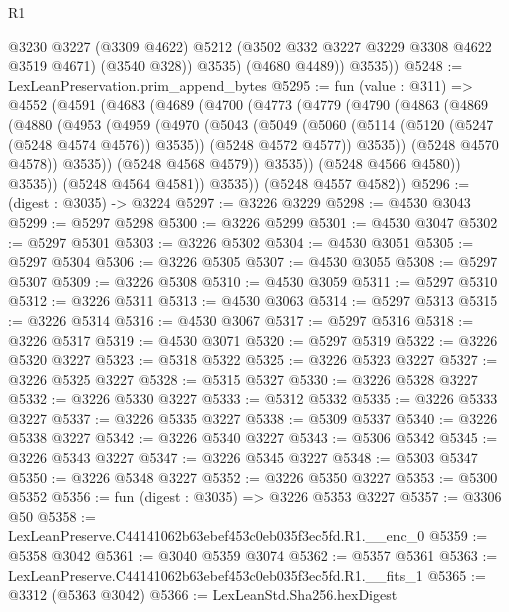 \begin{lexlean}{R1}
\begin{coremodule}
              @3230
              @3227
              (@3309 @4622)
              @5212
              (@3502 @332 @3227 @3229 @3308 @4622 @3519 @4671)
              (@3540 @328))
            @3535)
          (@4680 @4489))
        @3535))
@5248 := LexLeanPreservation.prim_append_bytes
@5295 := fun (value : @311) =>
  @4552
    (@4591
      (@4683
        (@4689
          (@4700
            (@4773
              (@4779
                (@4790
                  (@4863
                    (@4869
                      (@4880
                        (@4953
                          (@4959
                            (@4970
                              (@5043
                                (@5049
                                  (@5060
                                    (@5114 (@5120 (@5247 (@5248 @4574 @4576)) @3535))
                                    (@5248 @4572 @4577))
                                  @3535))
                              (@5248 @4570 @4578))
                            @3535))
                        (@5248 @4568 @4579))
                      @3535))
                  (@5248 @4566 @4580))
                @3535))
            (@5248 @4564 @4581))
          @3535))
      (@5248 @4557 @4582))
@5296 := (digest : @3035) -> @3224
@5297 := @3226 @3229
@5298 := @4530 @3043
@5299 := @5297 @5298
@5300 := @3226 @5299
@5301 := @4530 @3047
@5302 := @5297 @5301
@5303 := @3226 @5302
@5304 := @4530 @3051
@5305 := @5297 @5304
@5306 := @3226 @5305
@5307 := @4530 @3055
@5308 := @5297 @5307
@5309 := @3226 @5308
@5310 := @4530 @3059
@5311 := @5297 @5310
@5312 := @3226 @5311
@5313 := @4530 @3063
@5314 := @5297 @5313
@5315 := @3226 @5314
@5316 := @4530 @3067
@5317 := @5297 @5316
@5318 := @3226 @5317
@5319 := @4530 @3071
@5320 := @5297 @5319
@5322 := @3226 @5320 @3227
@5323 := @5318 @5322
@5325 := @3226 @5323 @3227
@5327 := @3226 @5325 @3227
@5328 := @5315 @5327
@5330 := @3226 @5328 @3227
@5332 := @3226 @5330 @3227
@5333 := @5312 @5332
@5335 := @3226 @5333 @3227
@5337 := @3226 @5335 @3227
@5338 := @5309 @5337
@5340 := @3226 @5338 @3227
@5342 := @3226 @5340 @3227
@5343 := @5306 @5342
@5345 := @3226 @5343 @3227
@5347 := @3226 @5345 @3227
@5348 := @5303 @5347
@5350 := @3226 @5348 @3227
@5352 := @3226 @5350 @3227
@5353 := @5300 @5352
@5356 := fun (digest : @3035) => @3226 @5353 @3227
@5357 := @3306 @50
@5358 := LexLeanPreserve.C44141062b63ebef453c0eb035f3ec5fd.R1.__enc_0
@5359 := @5358 @3042
@5361 := @3040 @5359 @3074
@5362 := @5357 @5361
@5363 := LexLeanPreserve.C44141062b63ebef453c0eb035f3ec5fd.R1.__fits_1
@5365 := @3312 (@5363 @3042)
@5366 := LexLeanStd.Sha256.hexDigest

\end{coremodule}
\end{lexlean}
